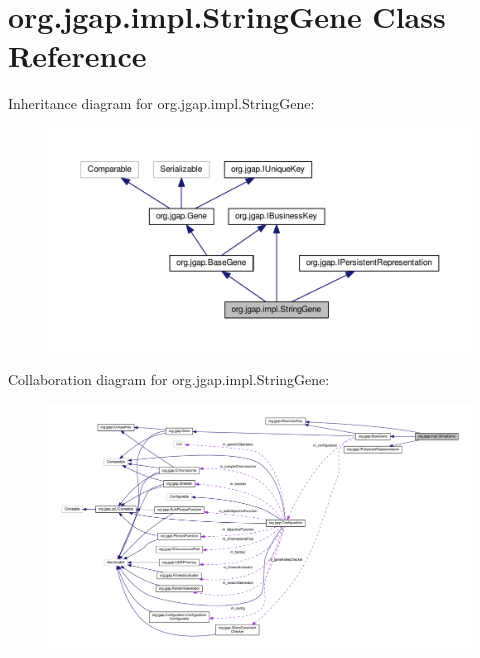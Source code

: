 \hypertarget{classorg_1_1jgap_1_1impl_1_1_string_gene}{\section{org.\-jgap.\-impl.\-String\-Gene Class Reference}
\label{classorg_1_1jgap_1_1impl_1_1_string_gene}
}


Inheritance diagram for org.\-jgap.\-impl.\-String\-Gene\-:
\nopagebreak
\begin{figure}[H]
\begin{center}
\leavevmode
\includegraphics[width=350pt]{classorg_1_1jgap_1_1impl_1_1_string_gene__inherit__graph}
\end{center}
\end{figure}


Collaboration diagram for org.\-jgap.\-impl.\-String\-Gene\-:
\nopagebreak
\begin{figure}[H]
\begin{center}
\leavevmode
\includegraphics[width=350pt]{classorg_1_1jgap_1_1impl_1_1_string_gene__coll__graph}
\end{center}
\end{figure}
